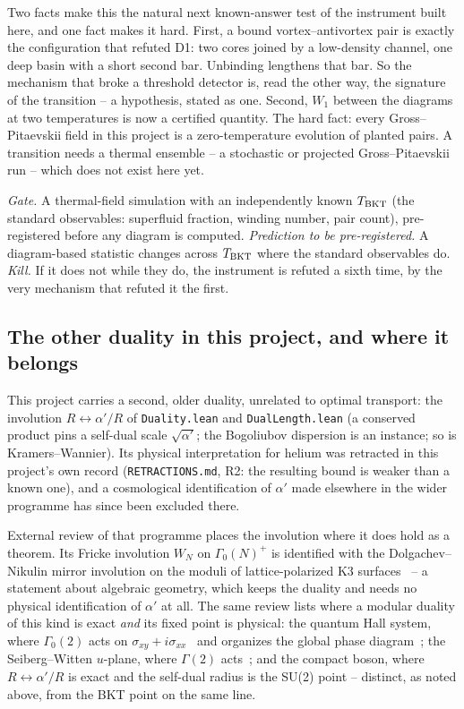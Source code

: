 \documentclass[11pt,a4paper]{article}
\newcommand{\lean}[1]{\texttt{\small #1}}
\begin{document}
Two facts make this the natural next known-answer test of the instrument built here, and one fact makes
it hard. First, a bound vortex--antivortex pair is exactly the configuration that refuted D1: two cores
joined by a low-density channel, one deep basin with a short second bar. Unbinding lengthens that bar.
So the mechanism that broke a threshold detector is, read the other way, the signature of the
transition -- a hypothesis, stated as one. Second, $W_1$ between the diagrams at two temperatures is
now a certified quantity. The hard fact: every Gross--Pitaevskii field in this project is a
zero-temperature evolution of planted pairs. A transition needs a thermal ensemble -- a stochastic or
projected Gross--Pitaevskii run -- which does not exist here yet.

\emph{Gate.} A thermal-field simulation with an independently known $T_{\rm BKT}$ (the standard
observables: superfluid fraction, winding number, pair count), pre-registered before any diagram is
computed. \emph{Prediction to be pre-registered.} A diagram-based statistic changes across $T_{\rm BKT}$
where the standard observables do. \emph{Kill.} If it does not while they do, the instrument is refuted
a sixth time, by the very mechanism that refuted it the first.

\subsection{The other duality in this project, and where it belongs}
\label{sec:otherduality}

This project carries a second, older duality, unrelated to optimal transport: the involution
$R\leftrightarrow\alpha'/R$ of \lean{Duality.lean} and \lean{DualLength.lean} (a conserved product pins
a self-dual scale $\sqrt{\alpha'}$; the Bogoliubov dispersion is an instance; so is Kramers--Wannier).
Its physical interpretation for helium was retracted in this project's own record
(\texttt{RETRACTIONS.md}, R2: the resulting bound is weaker than a known one), and a cosmological
identification of $\alpha'$ made elsewhere in the wider programme has since been excluded there.

External review of that programme places the involution where it does hold as a theorem. Its Fricke
involution $W_N$ on $\Gamma_0(N)^+$ is identified with the Dolgachev--Nikulin mirror involution on the
moduli of lattice-polarized K3 surfaces~\cite{Dolgachev1996} -- a statement about algebraic geometry,
which keeps the duality and needs no physical identification of $\alpha'$ at all. The same review lists
where a modular duality of this kind is exact \emph{and} its fixed point is physical: the quantum Hall
system, where $\Gamma_0(2)$ acts on $\sigma_{xy}+i\sigma_{xx}$~\cite{LutkenRoss1992} and organizes the
global phase diagram~\cite{KLZ1992}; the Seiberg--Witten $u$-plane, where $\Gamma(2)$ acts~\cite{SW1994};
and the compact boson, where $R\leftrightarrow\alpha'/R$ is exact and the self-dual radius is the SU(2)
point -- distinct, as noted above, from the BKT point on the same line.
\end{document}
